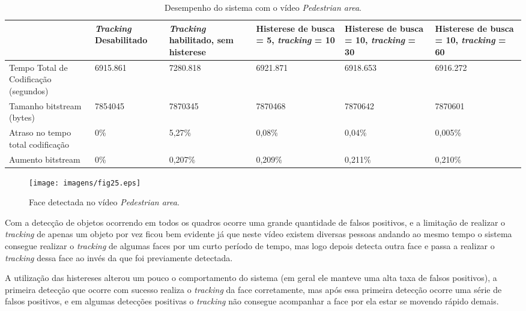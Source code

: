 \begin{table}[H]
\begin{center}
\begin{tabular}{|p{2.3cm}|p{2.3cm}|p{2.3cm}|p{2.3cm}|p{2.3cm}|p{2.3cm}|}
\hline
\textbf{} & \textbf{\textit{Tracking} Desabilitado} & \textbf{\textit{Tracking} habilitado, sem histerese} & \textbf{Histerese de busca = 5, \textit{tracking} = 10} & \textbf{Histerese de busca = 10, \textit{tracking} = 30} & \textbf{Histerese de busca = 10, \textit{tracking} = 60} \\
\hline
Tempo Total de Codificação (segundos) & 6915.861 & 7280.818 & 6921.871 & 6918.653 & 6916.272 \\
\hline
Tamanho bitstream (bytes) & 7854045 & 7870345 & 7870468 & 7870642 & 7870601 \\
\hline
Atraso no tempo total codificação & 0\% & 5,27\% & 0,08\% & 0,04\% & 0,005\% \\
\hline
Aumento bitstream  & 0\% & 0,207\% & 0,209\% & 0,211\% & 0,210\% \\
\hline
\end{tabular}
\caption{Desempenho do sistema com o vídeo \textit{Pedestrian area}.}
\label{tab:space_overhead}
\end{center}
\end{table}

\begin{figure}[H]
\centering
\texttt{[image: imagens/fig25.eps]}
\caption{Face detectada no vídeo \textit{Pedestrian area}.}
\label{fig:pedestrian_example}
\end{figure}

Com a detecção de objetos ocorrendo em todos os quadros ocorre uma grande quantidade de falsos positivos, e a limitação de realizar o \textit{tracking} de apenas um objeto por vez ficou bem evidente já que neste vídeo existem diversas pessoas andando ao mesmo tempo o sistema consegue realizar o \textit{tracking} de algumas faces por um curto período de tempo, mas logo depois detecta outra face e passa a realizar o \textit{tracking} dessa face ao invés da que foi previamente detectada. 

A utilização das histereses alterou um pouco o comportamento do sistema (em geral ele manteve uma alta taxa de falsos positivos), a primeira detecção que ocorre com sucesso realiza o \textit{tracking} da face corretamente, mas após essa primeira detecção ocorre uma série de falsos positivos, e em algumas detecções positivas o \textit{tracking} não consegue acompanhar a face por ela estar se movendo rápido demais.

